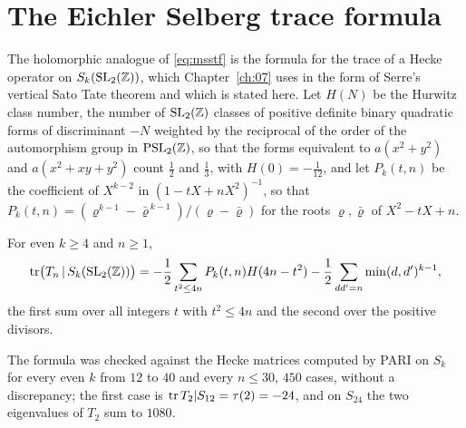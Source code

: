\section{The Eichler Selberg trace formula}\label{sec:mses}

The holomorphic analogue of \eqref{eq:msstf} is the formula for the trace of a Hecke operator on $S_k(\mathrm{SL}_2(\mathbb{Z}))$, which Chapter~\ref{ch:07} uses in the form of Serre's vertical Sato Tate theorem and which is stated here. Let $H(N)$ be the Hurwitz class number, the number of $\mathrm{SL}_2(\mathbb{Z})$ classes of positive definite binary quadratic forms of discriminant $-N$ weighted by the reciprocal of the order of the automorphism group in $\mathrm{PSL}_2(\mathbb{Z})$, so that the forms equivalent to $a(x^2+y^2)$ and $a(x^2+xy+y^2)$ count $\frac12$ and $\frac13$, with $H(0)=-\frac1{12}$, and let $P_k(t,n)$ be the coefficient of $X^{k-2}$ in $(1-tX+nX^2)^{-1}$, so that $P_k(t,n)=(\varrho^{k-1}-\bar\varrho^{\,k-1})/(\varrho-\bar\varrho)$ for the roots $\varrho,\bar\varrho$ of $X^2-tX+n$.

\begin{theorem}\label{thm:mses}
For even $k\ge4$ and $n\ge1$,
\[
\operatorname{tr}\bigl(T_n\,|\,S_k(\mathrm{SL}_2(\mathbb{Z}))\bigr)=-\frac12\sum_{t^2\le4n}P_k(t,n)H(4n-t^2)-\frac12\sum_{dd'=n}\min(d,d')^{k-1},
\]
the first sum over all integers $t$ with $t^2\le4n$ and the second over the positive divisors.
\end{theorem}

The formula was checked against the Hecke matrices computed by PARI on $S_k$ for every even $k$ from $12$ to $40$ and every $n\le30$, $450$ cases, without a discrepancy; the first case is $\operatorname{tr} T_2|S_{12}=\tau(2)=-24$, and on $S_{24}$ the two eigenvalues of $T_2$ sum to $1080$.

